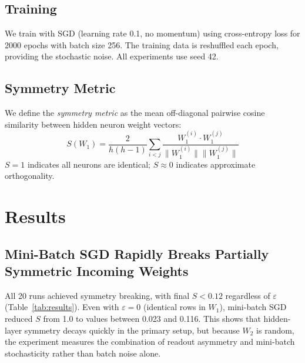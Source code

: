 \documentclass[11pt,a4paper]{article}
\begin{document}
\subsection{Training}

We train with SGD (learning rate 0.1, no momentum) using cross-entropy loss for 2000 epochs with batch size 256.
The training data is reshuffled each epoch, providing the stochastic noise.
All experiments use seed 42.

\subsection{Symmetry Metric}

We define the \emph{symmetry metric} as the mean off-diagonal pairwise cosine similarity between hidden neuron weight vectors:
\[
S(W_1) = \frac{2}{h(h-1)} \sum_{i < j} \frac{W_1^{(i)} \cdot W_1^{(j)}}{\|W_1^{(i)}\| \|W_1^{(j)}\|}
\]
$S = 1$ indicates all neurons are identical; $S \approx 0$ indicates approximate orthogonality.

\section{Results}

\subsection{Mini-Batch SGD Rapidly Breaks Partially Symmetric Incoming Weights}

All 20 runs achieved symmetry breaking, with final $S < 0.12$ regardless of $\varepsilon$ (Table~\ref{tab:results}).
Even with $\varepsilon = 0$ (identical rows in $W_1$), mini-batch SGD reduced $S$ from 1.0 to values between 0.023 and 0.116.
This shows that hidden-layer symmetry decays quickly in the primary setup, but because $W_2$ is random, the experiment measures the combination of readout asymmetry and mini-batch stochasticity rather than batch noise alone.
\end{document}
